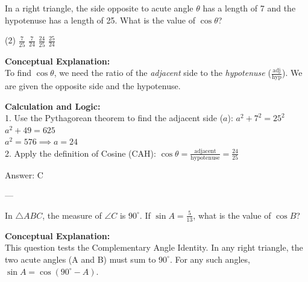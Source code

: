 \documentclass[11pt,paper=a4,answers]{exam}
\begin{document}
\begin{questions}
\pointsinrightmargin
\pointsdroppedatright
\marksnotpoints
{}
\pointformat{\boldmath\themarginpoints}
\bracketedpoints



\question
In a right triangle, the side opposite to acute angle $\theta$ has a length of 7 and the hypotenuse has a length of 25. What is the value of $\cos \theta$?
\begin{tasks}(2)
    \task $\frac{7}{25}$
    \task $\frac{7}{24}$
    \task $\frac{24}{25}$
    \task $\frac{25}{24}$
\end{tasks}

\begin{solution}
\textbf{Conceptual Explanation:} \\
To find $\cos \theta$, we need the ratio of the \textit{adjacent} side to the \textit{hypotenuse} ($\frac{\text{adj}}{\text{hyp}}$). We are given the opposite side and the hypotenuse.

\vspace{10pt}
\textbf{Calculation and Logic:} \\
1. Use the Pythagorean theorem to find the adjacent side ($a$):
   $a^2 + 7^2 = 25^2$ \\
   $a^2 + 49 = 625$ \\
   $a^2 = 576 \implies a = 24$ \\
2. Apply the definition of Cosine (CAH):
   $\cos \theta = \frac{\text{adjacent}}{\text{hypotenuse}} = \frac{24}{25}$

\vspace{15pt}
Answer: \colorbox{yellow!100}{C}
\end{solution}

---

\question
In $\triangle ABC$, the measure of $\angle C$ is $90^\circ$. If $\sin A = \frac{5}{13}$, what is the value of $\cos B$?

\begin{solution}
\textbf{Conceptual Explanation:} \\
This question tests the Complementary Angle Identity. In any right triangle, the two acute angles (A and B) must sum to $90^\circ$. For any such angles, $\sin A = \cos(90^\circ - A)$.


\end{solution}
\end{questions}
\end{document}
